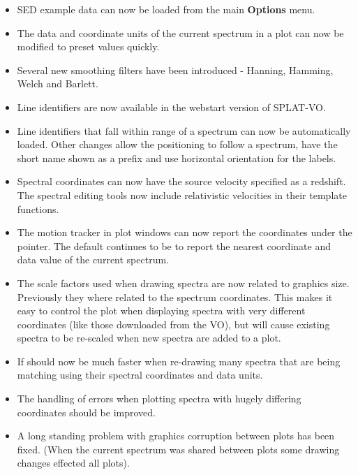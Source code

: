 \documentclass[twoside,11pt]{article}
\renewcommand{\_}{\texttt{\symbol{95}}}
\newcommand{\SPLAT}{\textsf{SPLAT-VO}}
\newcommand{\labelitem}[1]{\textbf{#1}}
\begin{document}
\begin{itemize}
\item SED example data can now be loaded from the main \labelitem{Options}
      menu.

\item The data and coordinate units of the current spectrum in a plot
      can now be modified to preset values quickly.

\item Several new smoothing filters have been introduced - Hanning, Hamming,
      Welch and Barlett.

\item Line identifiers are now available in the webstart version of \SPLAT.

\item Line identifiers that fall within range of a spectrum can now be
      automatically loaded. Other changes allow the positioning to follow
      a spectrum, have the short name shown as a prefix and use horizontal
      orientation for the labels.

\item Spectral coordinates can now have the source velocity specified
      as a redshift. The spectral editing tools now include relativistic
      velocities in their template functions.

\item The motion tracker in plot windows can now report the coordinates
      under the pointer. The default continues to be to report the nearest
      coordinate and data value of the current spectrum.

\item The scale factors used when drawing spectra are now related to
      graphics size. Previously they where related to the spectrum
      coordinates. This makes it easy to control the plot when displaying
      spectra with very different coordinates (like those downloaded from
      the VO), but will cause existing spectra to be re-scaled when new
      spectra are added to a plot.

\item If should now be much faster when re-drawing many spectra that are
      being matching using their spectral coordinates and data units.

\item The handling of errors when plotting spectra with hugely differing
      coordinates should be improved.

\item A long standing problem with graphics corruption between plots has
      been fixed. (When the current spectrum was shared between plots
      some drawing changes effected all plots).


\end{itemize}
\end{document}
